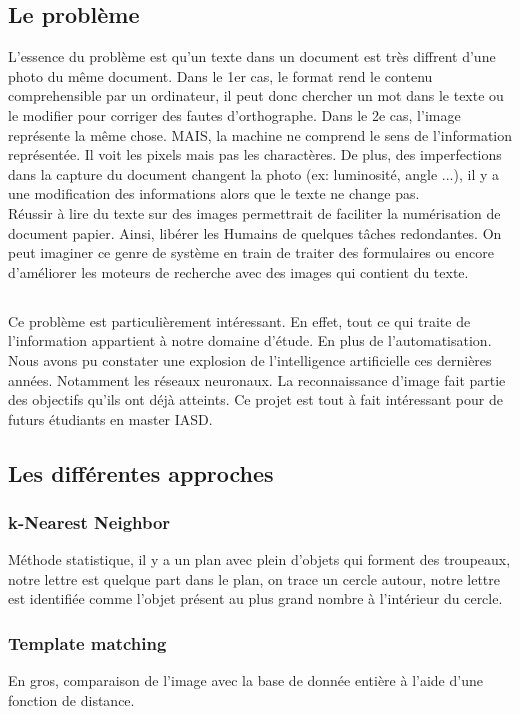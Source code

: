 \documentclass[a4paper]{article}
\begin{document}
		\subsection{Le problème}
			L'essence du problème est qu'un texte dans un document est très diffrent d'une photo du même document. Dans le 1er cas, le format rend le contenu comprehensible par un ordinateur, il peut donc 
			chercher un mot dans le texte ou le modifier pour corriger des fautes d'orthographe. Dans le 2e cas, l'image représente la même chose. MAIS, la machine ne comprend le sens de l'information 
			représentée. Il voit les pixels mais pas les charactères. De plus, des imperfections dans la capture du document changent la photo (ex: luminosité, angle ...), il y a une modification des informations
			alors que le texte ne change pas.
			\\Réussir à lire du texte sur des images permettrait de faciliter la numérisation de document papier. Ainsi, libérer les Humains de quelques tâches redondantes. On peut imaginer ce genre de 
			système en train de traiter des formulaires ou encore d'améliorer les moteurs de recherche avec des images qui contient du texte.
		\subsection*{}
			Ce problème est particulièrement intéressant. En effet, tout ce qui traite de l'information appartient à notre domaine d'étude. En plus de l'automatisation. Nous avons pu constater une explosion
			de l'intelligence artificielle ces dernières années. Notamment les réseaux neuronaux. La reconnaissance d'image fait partie des objectifs qu'ils ont déjà atteints. Ce projet est tout à fait 
			intéressant pour de futurs étudiants en master IASD.
		\subsection{Les différentes approches}
			\subsubsection{k-Nearest Neighbor}
				Méthode statistique, il y a un plan avec plein d'objets qui forment des troupeaux, notre lettre est quelque part dans le plan, on trace un cercle autour, notre lettre est identifiée comme l'objet présent au plus grand nombre à l'intérieur du cercle.
			\subsubsection{Template matching} 
				En gros, comparaison de l'image avec la base de donnée entière à l'aide d'une fonction de distance. 
\end{document}
